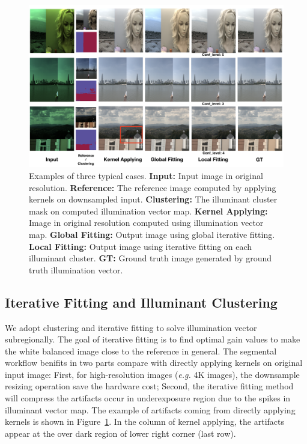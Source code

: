 \documentclass[10pt,twocolumn,letterpaper]{article}
\begin{document}
\begin{figure}[tb]
\begin{center}
\includegraphics[width=\linewidth]{../Images/vis_framework.png}
\end{center}
\caption{Examples of three typical cases.
        \textbf{Input:} Input image in original resolution.
        \textbf{Reference:} The reference image computed by applying kernels on downsampled input.
        \textbf{Clustering:} The illuminant cluster mask on computed illumination vector map.
        \textbf{Kernel Applying:} Image in original resolution computed using illumination vector map.
        \textbf{Global Fitting:} Output image using global iterative fitting.
        \textbf{Local Fitting:} Output image using iterative fitting on each illuminant cluster.
        \textbf{GT:} Ground truth image generated by ground truth illumination vector.
            }

\label{fig:visualization}
\end{figure}

\subsection{Iterative Fitting and Illuminant Clustering}
\label{subsection_iterative_fitting}
We adopt clustering and iterative fitting to solve illumination vector subregionally.
The goal of iterative fitting is to find optimal gain values to make the white balanced image close to the reference in general.
The segmental workflow benifits in two parts compare with directly applying kernels on original input image:
First, for high-resolution images (\textit{e.g.} 4K images), the downsample resizing operation save the hardware cost;
Second, the iterative fitting method will compress the artifacts occur in underexposure region
due to the spikes in illuminant vector map.
The example of artifacts coming from directly applying kernels is shown in Figure~\ref{fig:visualization}.
In the column of kernel applying,
the artifacts appear at the over dark region of lower right corner (last row).
\end{document}
